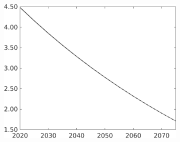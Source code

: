 \begin{figure}[h!!]
\begin{subfigure}{0.75\textwidth}
\begin{minipage}[]{0.32\textwidth}
\end{minipage}
\begin{minipage}[]{0.32\textwidth}
\includegraphics[width=1\textwidth]{../../codding_model/own_basedOnFried/optimalPol_010922_revision/figures/all_13Sept22/PerdifNoTauf_regime0_CompTaul_sn_spillover0_nsk0_xgr0_knspil1_sep0_LFlimit0_emsbase0_countec0_GovRev0_etaa0.79_lgd0.png}
\end{minipage}
	\end{subfigure}
		

\end{figure}
